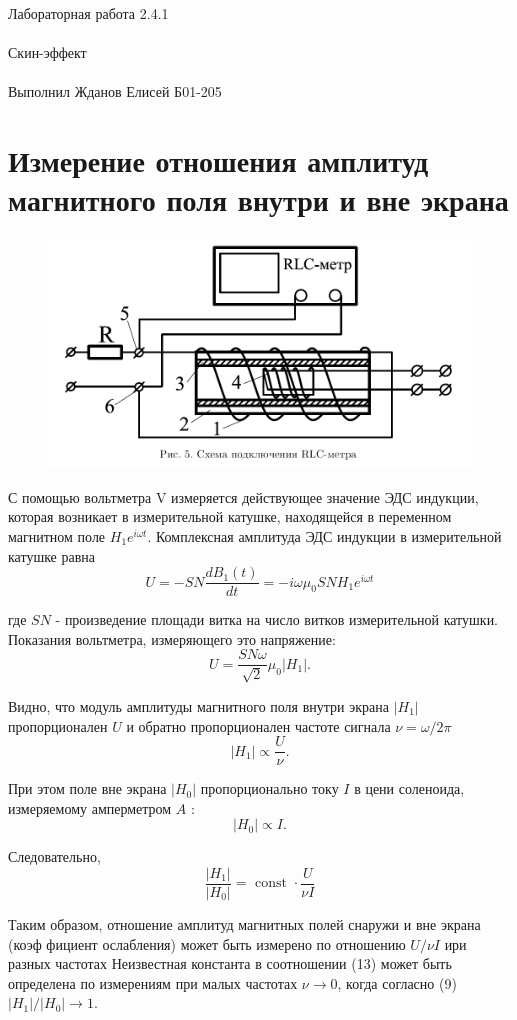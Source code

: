 \documentclass{astroedu-lab}
\begin{document}
\begin{problem}{\huge Лабораторная работа 2.4.1\\\\Скин-эффект\\\\Выполнил Жданов Елисей Б01-205}
\section{Измерение отношения амплитуд магнитного поля внутри и вне экрана}


\begin{figure}[!h]
	\centering
	\includegraphics[width=1\textwidth]{уст4.png}
	\label{fig:boiler}
\end{figure}

С помощью вольтметра V измеряется действующее значение ЭДС индукции, которая
возникает в измерительной катушке, находящейся в переменном магнитном поле $H_1 e^{i \omega t}$.
Комплексная амплитуда ЭДС индукции в измерительной катушке равна
\begin{equation}
	U = - S N \frac{d B_1(t)}{dt} = -i \omega \mu_0 S N H_1 e^{i \omega t}
\end{equation}

где $S N$ - произведение площади витка на число витков измерительной катушки. Показания вольтметра, измеряющего это напряжение:
$$
U=\frac{S N \omega}{\sqrt{2}} \mu_0\left|H_1\right| .
$$

Видно, что модуль амплитуды магнитного поля внутри экрана $\left|H_1\right|$ пропорционален $U$ и обратно пропорционален частоте сигнала $\nu=\omega / 2 \pi$
$$
\left|H_1\right| \propto \frac{U}{\nu} .
$$

При этом поле вне экрана $\left|H_0\right|$ пропорционально току $I$ в цени соленоида, измеряемому амперметром $A$ :
$$
\left|H_0\right| \propto I .
$$

Следовательно,
$$
\frac{\left|H_1\right|}{\left|H_0\right|}=\text { const } \cdot \frac{U}{\nu I}
$$

Таким образом, отношение амплитуд магнитных полей снаружи и вне экрана (коэф фициент ослабления) может быть измерено по отношению $U / \nu I$ ири разных частотах Неизвестная константа в соотношении (13) может быть определена по измерениям при малых частотах $\nu \rightarrow 0$, когда согласно (9) $\left|H_1\right| /\left|H_0\right| \rightarrow 1$.


\end{problem}
\end{document}
